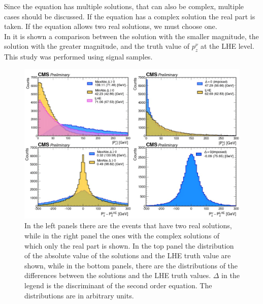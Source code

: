 Since the equation has multiple solutions, that can also be complex, multiple cases should be discussed. If the equation has a complex solution the real part is taken. If the equation allows two real solutions, we must choose one.\\
In  it is shown a comparison between the solution with the smaller magnitude, the solution with the greater magnitude, and the truth value of $p_z^\nu$ at the LHE level.\\
This study was performed using signal samples.


\begin{figure}[H]
    \centering
    \includegraphics[width=1\linewidth]{fig//chap07-selection/Pznu_LHE_comparison.png}
    \caption{In the left panels there are the events that have two real solutions, while in the right panel the ones with the complex solutions of which only the real part is shown. In the top panel the distribution of the absolute value of the solutions and the LHE truth value are shown, while in the bottom panels, there are the distributions of the differences between the solutions and the LHE truth values. $\Delta$ in the legend is the discriminant of the second order equation. The distributions are in arbitrary units.}
    \label{fig:nu_comparison}
\end{figure}




